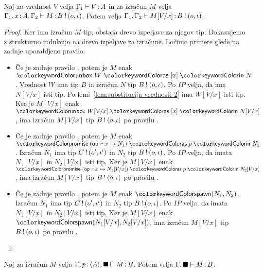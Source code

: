 \begin{lema}\label{lem:substitucija-izračuni-2}
	Naj za vrednost $V$ velja $\Gamma_1 \vdash V \mathinner{:} A$ in za izračun $M$ velja $\Gamma_1, x \mathinner{:} A, \Gamma_2 \vdash M \mathinner{:} B \mathbin{!} (o, \iota)$. Potem velja $\Gamma_1, \Gamma_2 \vdash M[V/x] \mathinner{:} B \mathbin{!} (o, \iota)$.
\end{lema}

\begin{proof}
	Ker ima izračun $M$ tip, obstaja drevo izpeljave za njegov tip.
	Dokazujemo z strukturno indukcijo na drevo izpeljave za izračune.
	Ločimo primere glede na zadnje uporabljeno pravilo.
	
	\begin{itemize}
		\item Če je zadnje pravilo , potem je $M$ enak $\tmunbox{W}{x}{N}$. Vrednost $W$ ima tip $B$ in izračun $N$ tip $B \mathbin{!} (o, \iota)$.
		Po $IP$ velja, da ima $N[V/x]$ isti tip. Po lemi~\ref{lem:substitucija-vrednosti-2} ima $W[V/x]$ isti tip. Ker je $M[V/x]$ enak $\tmunbox{W[V/x]}{x}{N[V/x]}$, ima izračun $M[V/x]$ tip $B \mathbin{!} (o, \iota)$ po pravilu .
		
		\item Če je zadnje pravilo , potem je $M$ enak $\tmwithrec{op}{r}{x}{N_1}{p}{N_2}$. Izračun $N_1$ ima tip $C \mathbin{!} (o', \iota')$ in $N_2$ tip $B \mathbin{!} (o, \iota)$.
		Po $IP$ velja, da imata $N_1[V/x]$ in $N_2[V/x]$ isti tip. Ker je $M[V/x]$ enak $\tmwithrec{op}{r}{x}{N_1[V/x]}{p}{N_2[V/x]}$, ima izračun $M[V/x]$ tip $B \mathbin{!} (o, \iota)$ po pravilu .
		
		\item Če je zadnje pravilo , potem je $M$ enak $\tmspawn{N_1}{N_2}$. Izračun $N_1$ ima tip $C \mathbin{!} (o', \iota')$ in $N_2$ tip $B \mathbin{!} (o, \iota)$.
		Po $IP$ velja, da imata $N_1[V/x]$ in $N_2[V/x]$ isti tip. Ker je $M[V/x]$ enak $\tmspawn{N_1[V/x]}{N_2[V/x]}$, ima izračun $M[V/x]$ tip $B \mathbin{!} (o, \iota)$ po pravilu .	
	\end{itemize}
	
\end{proof}

\begin{lema}\label{lem:promise-blackbox}
	Naj za izračun $M$ velja $\Gamma, p \mathinner{:} \langle A \rangle, \blacksquare \vdash M \mathinner{:} B$. Potem velja $\Gamma, \blacksquare \vdash M \mathinner{:} B$.
\end{lema}

